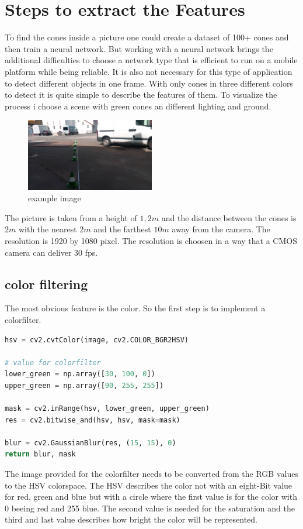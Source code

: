 \documentclass[10pt,a4paper]{article}
\begin{document}
	\section{Steps to extract the Features}
	To find the cones inside a picture one could create a dataset of 100+ cones and then train a neural network. But working with a neural network brings the additional difficulties to choose a network type that is efficient to run on a mobile platform while being reliable.
	It is also not necessary for this type of application to detect different objects in one frame.
	With only cones in three different colors to detect it is quite simple to describe the features of them.
	To visualize the process i choose a scene with green cones an different lighting and ground.
	\begin{figure}[h]
		\centering
		\includegraphics[width=0.5\textwidth]{Abb/start.png}
		\caption{example image}
		\label{example image}
	\end{figure}
	The picture is taken from a height of $1,2 m$ and the distance between the cones is $2m$ with the nearest $2m$ and the farthest $10m$ away from the camera. The resolution is 1920 by 1080 pixel. The resolution is choosen in a way that a CMOS camera can deliver 30 fps.
	 
	\subsection{color filtering}
	The most obvious feature is the color. So the first step is to implement a colorfilter.
	\begin{lstlisting}[language=Python]
hsv = cv2.cvtColor(image, cv2.COLOR_BGR2HSV)
	
# value for colorfilter
lower_green = np.array([30, 100, 0])
upper_green = np.array([90, 255, 255])
	
mask = cv2.inRange(hsv, lower_green, upper_green)
res = cv2.bitwise_and(hsv, hsv, mask=mask)

blur = cv2.GaussianBlur(res, (15, 15), 0)
return blur, mask
	\end{lstlisting}
	The image provided for the colorfilter needs to be converted from the RGB values to the HSV colorspace.
	The HSV describes the color not with an eight-Bit value for red, green and blue but with a circle where the first value is for the color with 0 beeing red and 255 blue.
	The second value is needed for the saturation and the third and last value describes how bright the color will be represented.
	
\end{document}
